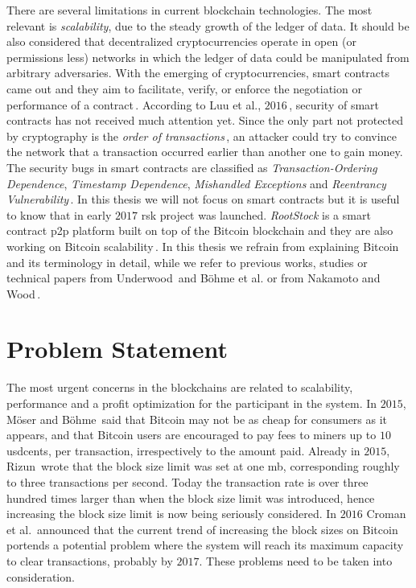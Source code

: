 \documentclass[USenglish]{uit-thesis}
\begin{document}
There are several limitations in current blockchain technologies.
The most relevant is \emph{scalability}, due to the steady growth of the
ledger of data. It should be also considered that
decentralized cryptocurrencies operate in open (or permissions less) networks
in which the ledger of data could be manipulated from arbitrary adversaries.
With the emerging of cryptocurrencies, smart contracts came out and
they aim to facilitate, verify, or enforce the negotiation
or performance of a contract\,\cite{szabo1996smartcontracts}.
According to Luu et al., $2016$\,\cite{Luu:2016},
security of smart contracts has not received much attention yet.
Since the only part not protected by cryptography
is the \emph{order of transactions}\,\cite{ethereum_white_paper},
an attacker could try to convince the network that a transaction
occurred earlier than another one to gain money.
The security bugs in smart contracts are classified as
\emph{Transaction-Ordering Dependence},
\emph{Timestamp Dependence}, \emph{Mishandled Exceptions}
and \emph{Reentrancy Vulnerability}\,\cite{Luu:2016}.
In this thesis we will not focus on smart contracts but it is
useful to know that in early $2017$ \gls{rsk} project
was launched. \emph{RootStock} is a smart contract
\gls{p2p} platform built on top of the Bitcoin blockchain and
they are also working on Bitcoin scalability\,\cite{rsk}.
In this thesis we refrain from explaining Bitcoin and its
terminology in detail, while we refer to previous
works, studies or technical papers
from Underwood\, and Böhme et al.\cite{Underwood:2016:BBB,
Bohme2015BETG}
or from Nakamoto and
Wood\,\cite{Nakamoto_bitcoin, ethereum_white_paper}.
\section{Problem Statement}
\label{sec:probdefinition}
The most urgent concerns in the blockchains
are related to scalability, performance and
a profit optimization for the participant
in the system.
In $2015$, Möser and Böhme\,\cite{Moser2015} said that
Bitcoin may not be as cheap for consumers as it appears, and
that Bitcoin users are encouraged to pay fees to miners up
to $10$ \gls{usd}cents, per transaction,
irrespectively to the amount paid.
Already in $2015$, Rizun\,\cite{Rizun:2015:blocksizelimit} wrote that
the block size limit was set at one \gls{mb}, corresponding
roughly to three transactions per second. Today
the transaction rate is over three hundred times larger
than when the block size limit was introduced, hence
increasing the block size limit
is now being seriously considered.
In $2016$ Croman et al.\,\cite{croman2016} announced that
the current trend of increasing the
block sizes on Bitcoin portends
a potential problem where the system
will reach its maximum capacity to clear
transactions, probably by $2017$.
These problems need to be taken
into consideration.
\end{document}
